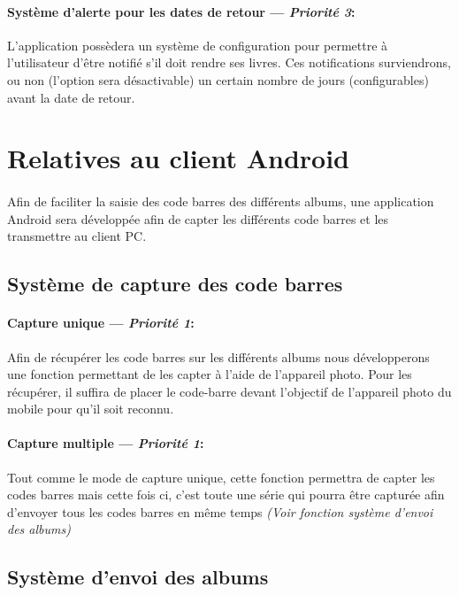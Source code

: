 \paragraph{Système d'alerte pour les dates de retour ---  \textit{Priorité 3}:}  
L'application possèdera un système de configuration pour permettre à l'utilisateur d'être notifié s'il doit rendre ses livres. Ces notifications surviendrons, ou non (l'option sera désactivable) un certain nombre de jours (configurables) avant la date de retour.



\section{Relatives au client Android} 


\paragraph{}
Afin de faciliter la saisie des code barres des différents albums, une application Android sera développée afin de capter les différents code barres et les transmettre au client PC.

\subsection{Système de capture des code barres}
\paragraph{Capture unique ---  \textit{Priorité 1}:}
Afin de récupérer les code barres sur les différents albums nous développerons une fonction permettant de les capter à l'aide de l'appareil photo.
Pour les récupérer, il suffira de placer le code-barre devant l'objectif de l'appareil photo du mobile pour qu'il soit reconnu.

\paragraph{Capture multiple ---  \textit{Priorité 1}:}
Tout comme le mode de capture unique, cette fonction permettra de capter les codes barres mais cette fois ci, c'est toute une série qui pourra être capturée afin d'envoyer tous les codes barres en même temps \textit{(Voir fonction système d'envoi des albums)}

\subsection{Système d'envoi des albums}
